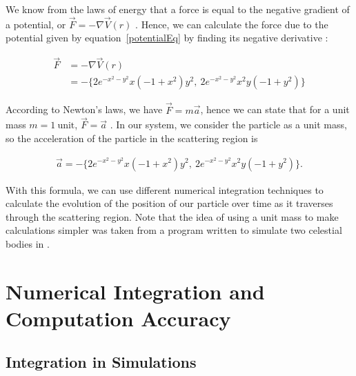 \documentclass[12pt]{article} %
\begin{document}
We know from the laws of energy that a force is equal to the negative gradient of a potential, or $ \vec{F} = -\nabla \vec{V} (r) $ \cite{pang2006introduction}. Hence, we can calculate the force due to the potential given by equation~\ref{potentialEq} by finding its negative derivative :

\begin{equation} \label{ForceEq}
\begin{split}
\vec{F} &= -  \nabla \vec{V} (r)  \\
&= - \{2 e^{-x^2-y^2} x (-1+x^2) y^2,\ 2 e^{-x^2-y^2} x^2 y (-1+y^2)\}
\end{split}
\end{equation}

According to Newton's laws, we have $\vec{F} = m \vec{a}$, hence we can state that for a unit mass $m = 1 \ \text{unit}$, $\vec{F} = \vec{a}$ \cite{pang2006introduction}. In our system, we consider the particle as a unit mass, so the acceleration of the particle in the scattering region is 

\begin{equation} \label{ForceEq}
\begin{split}
\vec{a} = - \{2 e^{-x^2-y^2} x (-1+x^2) y^2,\ 2 e^{-x^2-y^2} x^2 y (-1+y^2)\}.
\end{split}
\end{equation}




With this formula, we can use different numerical integration techniques to calculate the evolution of the position of our particle over time as it traverses through the scattering region. Note that the idea of using a unit mass to make calculations simpler was taken from a program written to simulate two celestial bodies in \cite{pang2006introduction}. 







\section{Numerical Integration and Computation Accuracy }  \label{Sec3:NumericalInt}%

\subsection{Integration in Simulations}
\end{document}
